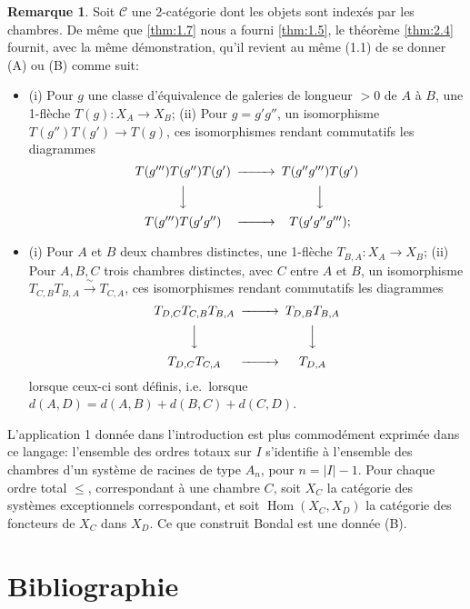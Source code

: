 \documentclass[11pt,a4paper]{article}
\theoremstyle{plain}
\theoremstyle{definition}
\newtheorem{remark}[theorem]{Remarque}
\DeclareMathOperator{\Hom}{Hom}
\newcommand{\cC}{\mathscr{C}}
\begin{document}
\begin{remark}\label{rem:2.6}
Soit $\cC$ une 2-cat\'egorie dont les objets sont index\'es par les chambres. De m\^eme que \ref{thm:1.7} nous a fourni \ref{thm:1.5}, le th\'eor\`eme \ref{thm:2.4} fournit, avec la m\^eme d\'emonstration, qu'il revient au m\^eme (1.1) de se donner (A) ou (B) comme suit:
\begin{itemize}
\item[(A)] (i) Pour $g$ une classe d'\'equivalence de galeries de longueur $> 0$ de $A$ \`a $B$, une 1-fl\`eche $T(g) : X_A \to X_B$;
\quad (ii) Pour $g = g' g''$, un isomorphisme $T(g'') T(g') \to T(g)$, ces isomorphismes rendant commutatifs les diagrammes
\[
\begin{CD}
T(g''') T(g'') T(g') @>>> T(g'' g''') T(g') \\
@VVV @VVV \\
T(g''') T(g' g'') @>>> T(g' g'' g''');
\end{CD}
\]
\item[(B)] (i) Pour $A$ et $B$ deux chambres distinctes, une 1-fl\`eche $T_{B,A} : X_A \to X_B$;
\quad (ii) Pour $A, B, C$ trois chambres distinctes, avec $C$ entre $A$ et $B$, un isomorphisme $T_{C,B} T_{B,A} \xrightarrow{\;\sim\;} T_{C,A}$, ces isomorphismes rendant commutatifs les diagrammes
\[
\begin{CD}
T_{D,C} T_{C,B} T_{B,A} @>>> T_{D,B} T_{B,A} \\
@VVV @VVV \\
T_{D,C} T_{C,A} @>>> T_{D,A}
\end{CD}
\]
lorsque ceux-ci sont d\'efinis, i.e.\ lorsque $d(A,D) = d(A,B) + d(B,C) + d(C,D)$.
\end{itemize}
L'application 1 donn\'ee dans l'introduction est plus commod\'ement exprim\'ee dans ce langage: l'ensemble des ordres totaux sur $I$ s'identifie \`a l'ensemble des chambres d'un syst\`eme de racines de type $A_n$, pour $n = |I| - 1$. Pour chaque ordre total $\leq$, correspondant \`a une chambre $C$, soit $X_C$ la cat\'egorie des syst\`emes exceptionnels correspondant, et soit $\Hom(X_C, X_D)$ la cat\'egorie des foncteurs de $X_C$ dans $X_D$. Ce que construit Bondal est une donn\'ee (B).
\end{remark}

\section*{Bibliographie}
\end{document}
